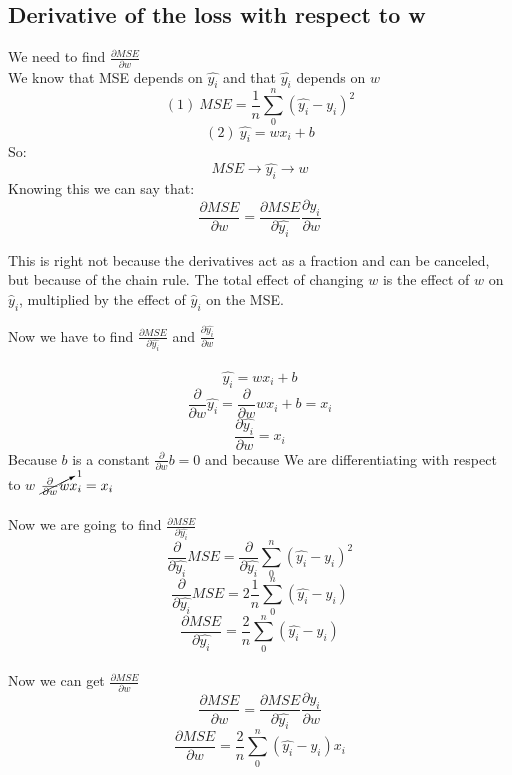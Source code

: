 \documentclass[12pt,a4paper]{article}
\begin{document}
			\subsection{Derivative of the loss with respect to w}
				We need to find $\frac{\partial MSE}{\partial w}$\\
				We know that MSE depends on $\hat{y_i}$ and that $\hat{y_i}$ depends on $w$
				$$(1)\	MSE=\frac{1}{n}\sum_{0}^{n} (\hat{y_i}-y_i)^2$$
				$$(2)\	\hat{y_i}=wx_i+b$$
				So:
				$$MSE \longrightarrow \hat{y_i} \longrightarrow w$$
				Knowing this we can say that:
				$$\frac{\partial MSE}{\partial w} = \frac{\partial MSE}{\partial \hat{y_i}}\frac{\partial \hat{y_i}}{\partial w}$$
				\begin{NOTE}
					This is right not because the derivatives act as a fraction and can be canceled, but because of the chain rule. The total effect of changing $w$ is the effect of $w$ on $\hat{y}_i$, multiplied by the effect of $\hat{y}_i$ on the MSE.
				\end{NOTE}
				Now we have to find $\frac{\partial MSE}{\partial \hat{y_i}}$ and $\frac{\partial \hat{y_i}}{\partial w}$\\
				\\
				$$\hat{y_i}=wx_i+b$$
				$$\frac{\partial}{\partial w}\hat{y_i}=\frac{\partial}{\partial w}wx_i+b = x_i$$
				$$\boxed{\frac{\partial \hat{y_i}}{\partial w} = x_i}$$
				Because $b$ is a constant $\frac{\partial }{\partial w} b = 0$ and because We are differentiating with respect to $w$ $ \cancelto{1}{\frac{\partial }{\partial w}w}x_i = x_i$\\
				\\
				Now we are going to find  $\frac{\partial MSE}{\partial \hat{y_i}}$
				$$\frac{\partial}{\partial \hat{y_i}}MSE=\frac{\partial}{\partial \hat{y_i}}\sum_{0}^{n} (\hat{y_i}-y_i)^2$$
				$$\frac{\partial}{\partial \hat{y_i}}MSE=2\frac{1}{n}\sum_{0}^{n}(\hat{y_i}-y_i)$$
				$$\boxed{\frac{\partial MSE}{\partial \hat{y_i}} = \frac{2}{n}\sum_{0}^{n}(\hat{y_i}-y_i)}$$
				\\
				Now we can get $\frac{\partial MSE}{\partial w}$
				$$\frac{\partial MSE}{\partial w} = \frac{\partial MSE}{\partial \hat{y_i}}\frac{\partial \hat{y_i}}{\partial w}$$
				$$\boxed{\frac{\partial MSE}{\partial w} = \frac{2}{n}\sum_{0}^{n}(\hat{y_i}-y_i) x_i}$$
\end{document}
